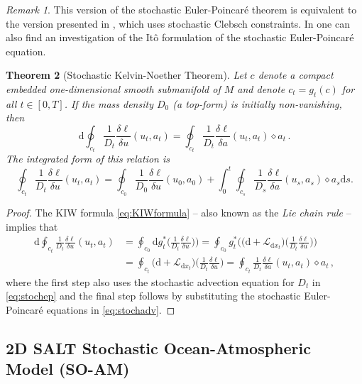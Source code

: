 \documentclass[11pt, oneside]{article}   	%
\numberwithin{equation}{section}
\theoremstyle{plain}
\newtheorem{theorem}{Theorem}[section]
\theoremstyle{definition}
\theoremstyle{remark}
\newtheorem{remark}[theorem]{Remark}
\newcommand{\<}{\langle}
\renewcommand{\>}{\rangle}
\def\rmd{{\mathrm{d}}}
\begin{document}
\begin{remark}
This version of the stochastic Euler-Poincar\'e theorem is equivalent to the version presented in \cite{Holm2015}, which uses stochastic Clebsch constraints. In \cite{Holm2015} one can also find an investigation of the It\^o formulation of the stochastic Euler-Poincar\'e equation. 
\end{remark}


\begin{theorem}[Stochastic Kelvin-Noether Theorem] \label{thm:Kelvin}
Let $c$ denote a compact embedded one-dimensional smooth submanifold of $M$ and denote $c_t=g_t(c)$ for all $t\in [0,T]$. If the mass density $D_0$ (a top-form) is initially non-vanishing, then
\[
{\rmd}\oint_{c_t}\frac{1}{D_t}\frac{{\delta} \ell}{{\delta} u}(u_t,a_t)
= \oint_{c_t}\frac{1}{D_t}\frac{{\delta} \ell}{{\delta} a}(u_t,a_t)\diamond a_t\,.
\]
The integrated form of this relation is 
\[
\oint_{c_t}\frac{1}{D_t}\frac{{\delta} \ell}{{\delta} u}(u_t,a_t)
=\oint_{c_0}\frac{1}{D_0}\frac{{\delta} \ell}{{\delta} u}(u_0,a_0)
+ \int_0^t\oint_{c_s}\frac{1}{D_s}\frac{{\delta} \ell}{{\delta} a}(u_s,a_s)\diamond a_s \rmd s.
\]
\end{theorem}

\begin{proof}
The KIW formula \eqref{eq:KIWformula} -- also known as the \emph{Lie chain rule} -- implies that 
\begin{align*}
{\rmd}\oint_{c_t}\frac{1}{D_t}\frac{{\delta} \ell}{{\delta} u}(u_t,a_t)
&=
\oint_{c_0}
{\rmd}
g_t^*\Big(\frac{1}{D_t} \frac{\delta\ell}{\delta u}\Big)\bigg)
=
\oint_{c_0}
g_t^*\bigg(\big({\rmd} + \mathcal{L}_{{\rmd}x_t} \big)\Big(\frac{1}{D_t} \frac{\delta\ell}{\delta u}\Big)\bigg)
\\&=
\oint_{c_t}
\big({\rmd} + \mathcal{L}_{{\rmd}x_t} \big)\Big(\frac{1}{D_t} \frac{\delta\ell}{\delta u}\Big)
= \oint_{c_t}\frac{1}{D_t}\frac{{\delta} \ell}{{\delta} a}(u_t,a_t)\diamond a_t\,,
\end{align*}
where the first step also uses the stochastic advection equation for $D_t$ in \eqref{eq:stochep} and 
the final step follows by substituting the stochastic Euler-Poincar\'e equations in \eqref{eq:stochadv}.

\end{proof}


\subsection{2D SALT Stochastic Ocean-Atmospheric Model (SO-AM) }\label{Section-SALT}\label{sec-SAM}
\end{document}
